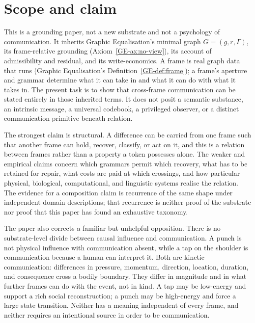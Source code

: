 \documentclass[11pt,a4paper]{article}
\theoremstyle{remark}\newtheorem{remark}[definition]{Remark}
\begin{document}
\section{Scope and claim}\label{sec:scope}

This is a grounding paper, not a new substrate and not a psychology of
communication. It inherits Graphic Equalisation's minimal graph $G=(g,r,\Gamma)$,
its frame-relative grounding (Axiom~\ref{GE-ax:no-view}), its account of
admissibility and residual, and its write-economics. A frame is real graph data
that runs (Graphic Equalisation's Definition~\ref{GE-def:frame}); a frame's
aperture and grammar determine what it can take in and what it can do with what
it takes in. The present task is to show that cross-frame communication can be
stated entirely in those inherited terms. It does not posit a semantic substance,
an intrinsic message, a universal codebook, a privileged observer, or a distinct
communication primitive beneath relation.

The strongest claim is structural. A difference can be carried from one frame
such that another frame can hold, recover, classify, or act on it, and this is a
relation between frames rather than a property a token possesses alone. The
weaker and empirical claims concern which grammars permit which recovery, what
has to be retained for repair, what costs are paid at which crossings, and how
particular physical, biological, computational, and linguistic systems realise
the relation. The evidence for a composition claim is recurrence of the same
shape under independent domain descriptions; that recurrence is neither proof of
the substrate nor proof that this paper has found an exhaustive taxonomy.

The paper also corrects a familiar but unhelpful opposition. There is no
substrate-level divide between causal influence and communication. A punch is
not physical influence with communication absent, while a tap on the shoulder is
communication because a human can interpret it. Both are kinetic communication:
differences in pressure, momentum, direction, location, duration, and consequence
cross a bodily boundary. They differ in magnitude and in what further frames can
do with the event, not in kind. A tap may be low-energy and support a rich social
reconstruction; a punch may be high-energy and force a large state transition.
Neither has a meaning independent of every frame, and neither requires an
intentional source in order to be communication.
\end{document}
